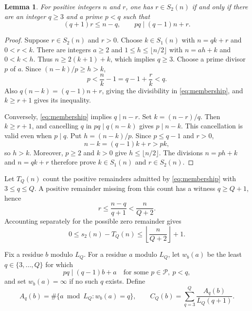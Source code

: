 \documentclass[11pt]{article}
\newtheorem{lemma}[theorem]{Lemma}
\newcommand{\PP}{\mathcal P}
\begin{document}
\begin{lemma}\label{lem:membership}
For positive integers $n$ and $r$, one has $r\in S_2(n)$ if and only if
there are an integer $q\ge3$ and a prime $p<q$ such that
\begin{equation}\label{eq:membership}
 (q+1)r\le n-q,\qquad pq\mid(q-1)n+r.
\end{equation}
\end{lemma}
\begin{proof}
Suppose $r\in S_2(n)$ and $r>0$. Choose $k\in S_1(n)$ with
$n=qk+r$ and $0<r<k$. There are integers $a\ge2$ and
$1\le h\le\lfloor n/2\rfloor$ with $n=ah+k$ and $0<k<h$.
Thus $n\ge2(k+1)+k$, which implies $q\ge3$. Choose a prime divisor
$p$ of $a$. Since $(n-k)/p\ge h>k$,
\[
 p<\frac nk-1=q-1+\frac rk<q.
\]
Also $q(n-k)=(q-1)n+r$, giving the divisibility in
\eqref{eq:membership}, and $k\ge r+1$ gives its inequality.

Conversely, \eqref{eq:membership} implies $q\mid n-r$. Set
$k=(n-r)/q$. Then $k\ge r+1$, and cancelling $q$ in
$pq\mid q(n-k)$ gives $p\mid n-k$. This cancellation is valid even
when $p\mid q$. Put $h=(n-k)/p$. Since $p\le q-1$ and $r>0$,
\[
 n-k=(q-1)k+r>pk,
\]
so $h>k$. Moreover, $p\ge2$ and $k>0$ give
$h\le\lfloor n/2\rfloor$. The divisions $n=ph+k$ and $n=qk+r$
therefore prove $k\in S_1(n)$ and $r\in S_2(n)$.
\end{proof}

Let $T_Q(n)$ count the positive remainders admitted by
\eqref{eq:membership} with $3\le q\le Q$. A positive remainder
missing from this count has a witness $q\ge Q+1$, hence
\[
 r\le\frac{n-q}{q+1}<\frac{n}{Q+2}.
\]
Accounting separately for the possible zero remainder gives
\begin{equation}\label{eq:tail}
 0\le s_2(n)-T_Q(n)\le\left\lfloor\frac{n}{Q+2}\right\rfloor+1.
\end{equation}

Fix a residue $b$ modulo $L_Q$. For a residue $a$ modulo $L_Q$, let
$w_b(a)$ be the least $q\in\{3,\ldots,Q\}$ for which
\begin{equation}\label{eq:first}
 pq\mid(q-1)b+a\quad\text{for some }p\in\PP,\ p<q,
\end{equation}
and set $w_b(a)=\infty$ if no such $q$ exists. Define
\begin{equation}\label{eq:coefficient}
 A_q(b)=\#\{a\bmod L_Q:w_b(a)=q\},\qquad
 C_Q(b)=\sum_{q=3}^{Q}\frac{A_q(b)}{L_Q(q+1)}.
\end{equation}
\end{document}
